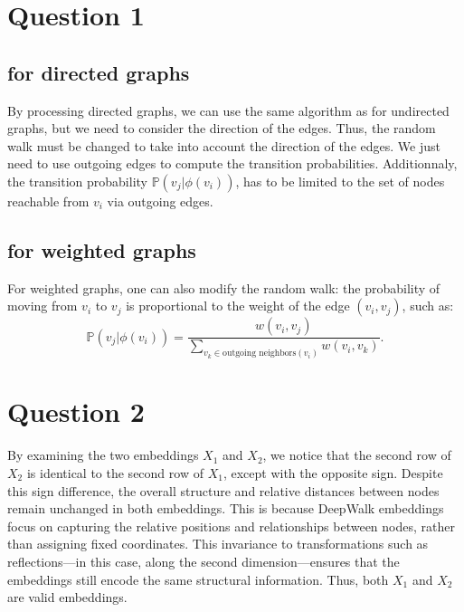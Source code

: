 \documentclass[a4paper]{article}
\begin{document}



\section*{Question 1}
\subsection*{for directed graphs}
By processing directed graphs, we can use the same algorithm
as for undirected graphs, but we need to consider the direction of the edges.
Thus, the random walk must be changed to take into account the direction of the edges.
We just need to use outgoing edges to compute the transition probabilities.
Additionnaly, the transition probability $\mathbb{P}(v_j | \phi(v_i))$, has to be limited to
the set of nodes reachable from $v_i$ via outgoing edges.

\subsection*{for weighted graphs}
For weighted graphs, one can also modify the random walk: the probability of moving
from $v_i$ to $v_j$ is proportional to the weight of the edge $(v_i, v_j)$, such as:
$$
\mathbb{P}(v_j | \phi(v_i)) = \frac{w(v_i, v_j)}{\sum_{v_k \in \text{outgoing neighbors}(v_i)} w(v_i, v_k)}.
$$

\section*{Question 2}

By examining the two embeddings $X_1$ and $X_2$, we notice that the second row of $X_2$ is
identical to the second row of $X_1$, except with the opposite sign. Despite this sign difference,
the overall structure and relative distances between nodes remain unchanged
in both embeddings. This is because DeepWalk embeddings focus on
capturing the relative positions and relationships between nodes,
rather than assigning fixed coordinates. This invariance to transformations
such as reflections—in this case, along the second dimension—ensures that
the embeddings still encode the same structural information. Thus, both 
$X_1$ and $X_2$ are valid embeddings.	
\end{document}
